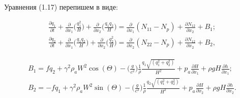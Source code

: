 \documentclass[14pt]{extreport}
\begin{document}
Уравнения (1.17) перепишем в виде:


\begin{eqnarray} 
\frac{\partial q_1}{\partial t} + \frac{\partial}{\partial x_1} \bigg(\frac{q_1^2}{H}\bigg)+\frac{\partial }{\partial x_2}\bigg(\frac{q_1 q_2}{H}\bigg) = \frac{\partial}{\partial x_1} (N_{11}-N_p) + \frac{\partial N_{12}}{\partial x_2} + B_1; \nonumber\\
\frac{\partial q_2}{\partial t} + \frac{\partial}{\partial x_1} \bigg(\frac{q_1 q_2}{H}\bigg)+\frac{\partial }{\partial x_2}\bigg(\frac{q_2^2}{H}\bigg) = \frac{\partial}{\partial x_2} (N_{22}-N_p) + \frac{\partial N_{12}}{\partial x_2} + B_2,
\end{eqnarray}


\begin{eqnarray}
B_1=fq_2+\gamma^2\rho_aW^2\cos(\Theta)-\bigg(\frac{g}{c^2}\bigg)\frac{1}{\rho}\frac{q_1\sqrt{(q_1^2+q_2^2)}}{H^2} + p_a \frac{\partial H}{\partial x_1} + \rho gH\frac{\partial h}{\partial x_1}; \nonumber\\
B_2=-fq_1+\gamma^2\rho_aW^2\sin(\Theta)-\bigg(\frac{g}{c^2}\bigg)\frac{1}{\rho}\frac{q_2\sqrt{(q_1^2+q_2^2)}}{H^2} + p_a \frac{\partial H}{\partial x_2} + \rho gH\frac{\partial h}{\partial x_2}.
\end{eqnarray}
\end{document}
